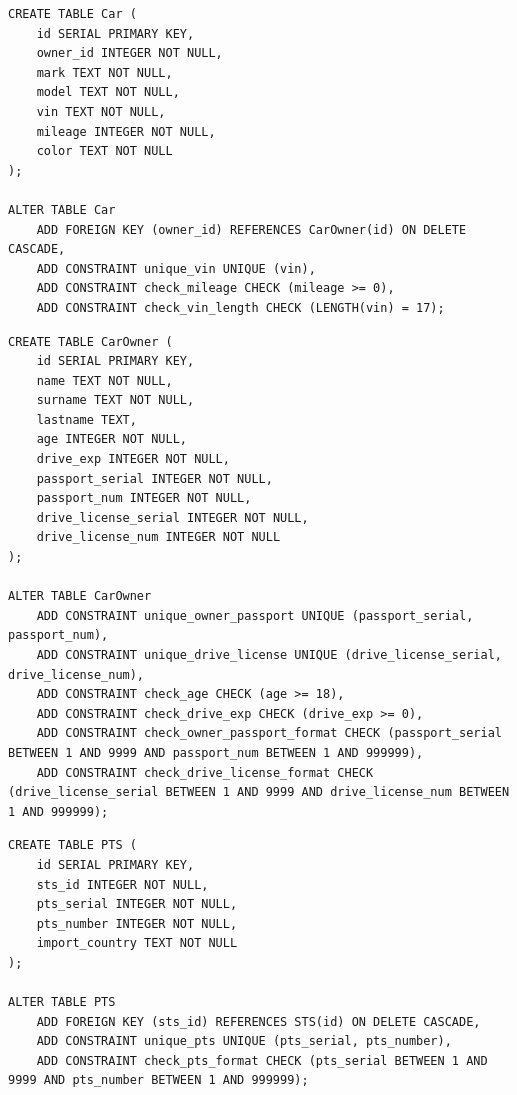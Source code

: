 \begin{center}
\captionsetup{justification=raggedright,singlelinecheck=off}
\begin{lstlisting}[label=tablecreate-2, caption=Создание таблицы Car]
CREATE TABLE Car (
    id SERIAL PRIMARY KEY,
    owner_id INTEGER NOT NULL,
    mark TEXT NOT NULL,
    model TEXT NOT NULL,
    vin TEXT NOT NULL,
    mileage INTEGER NOT NULL,
    color TEXT NOT NULL
);

ALTER TABLE Car
    ADD FOREIGN KEY (owner_id) REFERENCES CarOwner(id) ON DELETE CASCADE,
    ADD CONSTRAINT unique_vin UNIQUE (vin),
    ADD CONSTRAINT check_mileage CHECK (mileage >= 0),
    ADD CONSTRAINT check_vin_length CHECK (LENGTH(vin) = 17);
\end{lstlisting}
\end{center}

\begin{center}
\captionsetup{justification=raggedright,singlelinecheck=off}
\begin{lstlisting}[label=tablecreate-3, caption=Создание таблицы CarOwner]
CREATE TABLE CarOwner (
    id SERIAL PRIMARY KEY,
    name TEXT NOT NULL,
    surname TEXT NOT NULL,
    lastname TEXT,
    age INTEGER NOT NULL,
    drive_exp INTEGER NOT NULL,
    passport_serial INTEGER NOT NULL,
    passport_num INTEGER NOT NULL,
    drive_license_serial INTEGER NOT NULL,
    drive_license_num INTEGER NOT NULL
);

ALTER TABLE CarOwner
    ADD CONSTRAINT unique_owner_passport UNIQUE (passport_serial, passport_num),
    ADD CONSTRAINT unique_drive_license UNIQUE (drive_license_serial, drive_license_num),
    ADD CONSTRAINT check_age CHECK (age >= 18),
    ADD CONSTRAINT check_drive_exp CHECK (drive_exp >= 0),
    ADD CONSTRAINT check_owner_passport_format CHECK (passport_serial BETWEEN 1 AND 9999 AND passport_num BETWEEN 1 AND 999999),
    ADD CONSTRAINT check_drive_license_format CHECK (drive_license_serial BETWEEN 1 AND 9999 AND drive_license_num BETWEEN 1 AND 999999);
\end{lstlisting}
\end{center}

\begin{center}
\captionsetup{justification=raggedright,singlelinecheck=off}
\begin{lstlisting}[label=tablecreate-4, caption=Создание таблицы PTS]
CREATE TABLE PTS (
    id SERIAL PRIMARY KEY,
    sts_id INTEGER NOT NULL,
    pts_serial INTEGER NOT NULL,
    pts_number INTEGER NOT NULL,
    import_country TEXT NOT NULL
);

ALTER TABLE PTS
    ADD FOREIGN KEY (sts_id) REFERENCES STS(id) ON DELETE CASCADE,
    ADD CONSTRAINT unique_pts UNIQUE (pts_serial, pts_number),
    ADD CONSTRAINT check_pts_format CHECK (pts_serial BETWEEN 1 AND 9999 AND pts_number BETWEEN 1 AND 999999);
\end{lstlisting}
\end{center}

